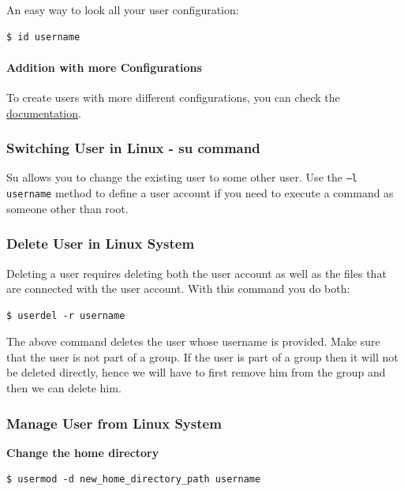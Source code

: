 \documentclass{article}
\newenvironment{blocktemplateI}[1]{%
    \tcolorbox[beamer,%
    noparskip,breakable,
    colframe=Violet,%
    colbacklower=Black,%
    title=#1]}%
    {\endtcolorbox}
\newenvironment{blocktemplateIII}[1]{%
    \tcolorbox[beamer,%
    noparskip,breakable,
    ,colframe=Red,%
    colbacklower=LimeGreen!75!LightGreen,%
    title=#1]}%
    {\endtcolorbox}
\newenvironment{codetemplate}[1][]{%
  \mybasecolorbox[#1]
  \itshape
}{%
  \endmybasecolorbox
}
\begin{document}
\begin{blocktemplateI}{NOTE}
An easy way to look all your user configuration:
\begin{codetemplate}{}
\begin{verbatim}
$ id username
\end{verbatim}
\end{codetemplate}
\end{blocktemplateI}

\paragraph{Addition with more Configurations}
To create users with more different configurations, you can check the \href{https://linuxize.com/post/how-to-create-users-in-linux-using-the-useradd-command/}{documentation}.

\subsubsection{Switching User in Linux - su command}

Su allows you to change the existing user to some other user. Use the \verb|–l username| method to define a user account if you need to execute a command as someone other than root.

\subsubsection{Delete User in Linux System}
 Deleting a user requires deleting both the user account as well as the files that are connected with the user account. With this command you do both:
\begin{codetemplate}{}
\begin{verbatim}
$ userdel -r username
\end{verbatim}
\end{codetemplate}

\begin{blocktemplateIII}{WARNING}
The above command deletes the user whose username is provided. Make sure that the user is not part of a group. If the user is part of a group then it will not be deleted directly, hence we will have to first remove him from the group and then we can delete him.  
\end{blocktemplateIII}

\subsubsection{Manage User from Linux System}
\textbf{Change the home directory}
\begin{codetemplate}{}
\begin{verbatim}
$ usermod -d new_home_directory_path username
\end{verbatim}
\end{codetemplate}
\end{document}
